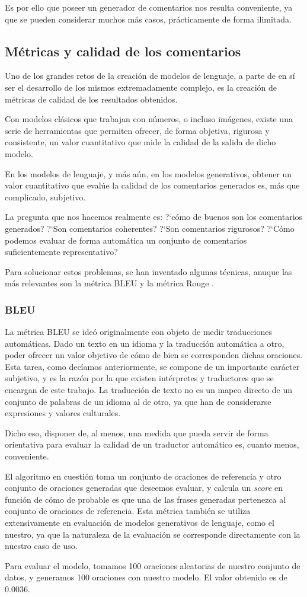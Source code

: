 Es por ello que poseer un generador de comentarios nos resulta conveniente, ya que se pueden considerar muchos más casos, prácticamente de forma ilimitada.

\subsection{Métricas y calidad de los comentarios}

Uno de los grandes retos de la creación de modelos de lenguaje, a parte de en sí ser el desarrollo de los mismos extremadamente complejo, es la creación de métricas de calidad de los resultados obtenidos.

Con modelos clásicos que trabajan con números, o incluso imágenes, existe una serie de herramientas que permiten ofrecer, de forma objetiva, rigurosa y consistente, un valor cuantitativo que mide la calidad de la salida de dicho modelo.

En los modelos de lenguaje, y más aún, en los modelos generativos, obtener un valor cuantitativo que evalúe la calidad de los comentarios generados es, más que complicado, subjetivo.

La pregunta que nos hacemos realmente es: ?`cómo de buenos son los comentarios generados? ?`Son comentarios coherentes? ?`Son comentarios rigurosos? ?`Cómo podemos evaluar de forma automática un conjunto de comentarios suficientemente representativo?

Para solucionar estos problemas, se han inventado algunas técnicas, anuque las más relevantes son la métrica BLEU \cite{BLEU} y la métrica Rouge \cite{lin2004rouge}.

\subsubsection{BLEU}
La métrica BLEU se ideó originalmente con objeto de medir traducciones automáticas. Dado un texto en un idioma y la traducción automática a otro, poder ofrecer un valor objetivo de cómo de bien se corresponden dichas oraciones. Esta tarea, como decíamos anteriormente, se compone de un importante carácter subjetivo, y es la razón por la que existen intérpretes y traductores que se encargan de este trabajo. La traducción de texto no es un mapeo directo de un conjunto de palabras de un idioma al de otro, ya que han de considerarse expresiones y valores culturales.

Dicho eso, disponer de, al menos, una medida que pueda servir de forma orientativa para evaluar la calidad de un traductor automático es, cuanto menos, conveniente.

El algoritmo en cuestión toma un conjunto de oraciones de referencia y otro conjunto de oraciones generadas que deseemos evaluar, y calcula un \textit{score} en función de cómo de probable es que una de las frases generadas pertenezca al conjunto de oraciones de referencia. Esta métrica también se utiliza extensivamente en evaluación de modelos generativos de lenguaje, como el nuestro, ya que la naturaleza de la evaluación se corresponde directamente con la nuestro caso de uso.


Para evaluar el modelo, tomamos 100 oraciones aleatorias de nuestro conjunto de datos, y generamos 100 oraciones con nuestro modelo. El valor obtenido es de 0.0036. 
